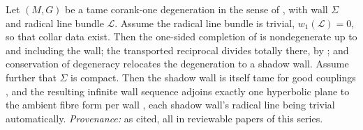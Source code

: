 Let $(M, G)$ be a tame corank-one degeneration in the sense of \cite[Hyp.~2.1]{ButlerT4}, with wall $\Sigma$ and radical line bundle $\mathcal{L}$. Assume the radical line bundle is trivial, $w_1(\mathcal{L}) = 0$, so that collar data exist. Then the one-sided completion of \cite[Thm.~4.4]{ButlerT4} is nondegenerate up to and including the wall; the transported reciprocal divides totally there, by \cite[Thm.~4.10]{ButlerT1}; and conservation of degeneracy \cite[Thm.~5.1, Prop.~5.2]{ButlerT4} relocates the degeneration to a shadow wall. Assume further that $\Sigma$ is compact. Then the shadow wall is itself tame for good couplings \cite[Lem.~5.3]{ButlerT4}, and the resulting infinite wall sequence adjoins exactly one hyperbolic plane to the ambient fibre form per wall \cite[Rem.~5.4, Cor.~5.5]{ButlerT4}, each shadow wall's radical line being trivial automatically. \emph{Provenance:} as cited, all in reviewable papers of this series.
